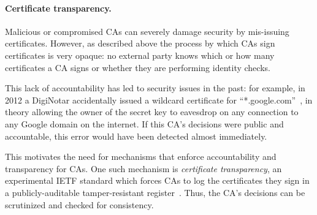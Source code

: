 \paragraph{Certificate transparency.} Malicious or compromised CAs can severely damage
security by mis-issuing certificates. However, as described above the process by which CAs
sign certificates is very opaque: no external party knows which or how many certificates
a CA signs or whether they are performing identity checks.

This lack of accountability has led to security issues in the past:
for example, in 2012 a DigiNotar accidentally issued a wildcard
certificate for ``*.google.com''~\cite{diginotar2011mitm}, in theory allowing the owner of the
secret key to eavesdrop on any connection to any Google domain on the
internet.  If this CA's decisions were public and accountable, this
error would have been detected almost immediately.

This motivates the need for mechanisms that enforce accountability
and transparency for CAs. One such mechanism is \emph{certificate transparency},
an experimental IETF standard which forces CAs to log the certificates they
sign in a publicly-auditable tamper-resistant register~\cite{laurie2013certificate}. Thus, the CA's
decisions can be scrutinized and checked for consistency. 







